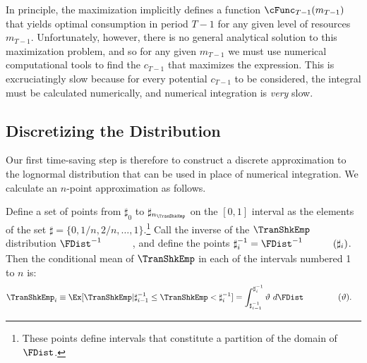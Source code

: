 \documentclass[titlepage, headings=optiontotocandhead]{\econtex}
\begin{document}
In principle, the maximization implicitly defines a function  
$\cFunc_{T-1}({m}_{T-1})$ that yields optimal consumption
in period $T-1$ for any given level of resources ${m}_{T-1}$.
Unfortunately, however, there is no general analytical solution to this
maximization problem, and so for any given ${m}_{T-1}$ we must
use numerical computational tools to find the ${c}_{T-1}$ that maximizes the
expression.  This is excruciatingly slow because for every
potential ${c}_{T-1}$ to be considered, the integral must be calculated
numerically, and numerical integration is \textit{very} slow.

\hypertarget{Discretizing-the-Distribution}{}
\subsection{Discretizing the Distribution}
Our first time-saving step is therefore to construct a discrete
approximation to the lognormal distribution that can be used in place
of numerical integration.  We calculate an $n$-point approximation as
follows.

 Define a set of points from $\sharp_{0}$ to $\sharp_{n_{\TranShkEmp}}$ on the $[0,1]$ interval
as the elements of the set $\sharp = \{0,1/n,2/n, \ldots,1\}$.\footnote{These points define intervals that constitute a partition of the domain of $\FDist$.}  Call the inverse of the $\TranShkEmp$ distribution $\FDist^{-1}_{\phantom{\TranShkEmp}}$, and define the
points $\sharp^{-1}_{i} = \FDist^{-1}_{\phantom{\TranShkEmp}}(\sharp_{i})$.  Then
the conditional mean of $\TranShkEmp$ in each of the intervals numbered 1 to $n$ is:
\begin{equation}\begin{gathered}\begin{aligned}
      \TranShkEmp_{i} \equiv \Ex[\TranShkEmp | \sharp_{i-1}^{-1} \leq \TranShkEmp < \sharp_{i}^{-1}]  & = \int_{\sharp^{-1}_{i-1}}^{\sharp^{-1}_{i}} \vartheta ~ d\FDist_{\phantom{\TranShkEmp}}(\vartheta)  .
    \end{aligned}\end{gathered}\end{equation}
\end{document}
